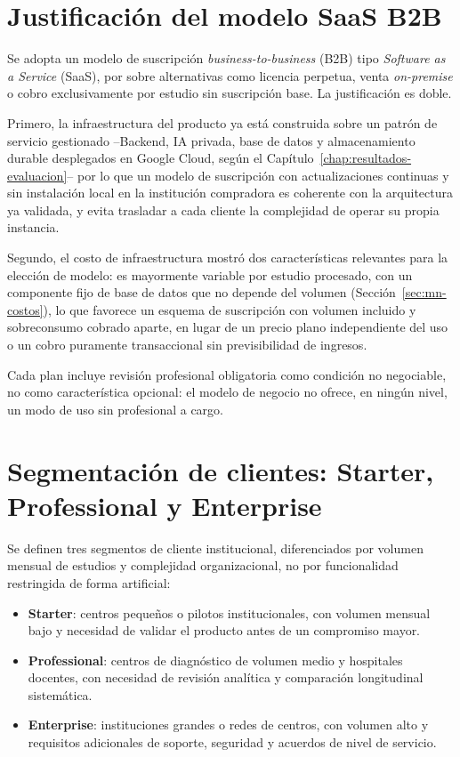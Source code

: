 \section{Justificación del modelo SaaS B2B}
\label{sec:mn-justificacion-saas}

Se adopta un modelo de suscripción \textit{business-to-business} (B2B) tipo \textit{Software as a Service} (SaaS), por sobre alternativas como licencia perpetua, venta \textit{on-premise} o cobro exclusivamente por estudio sin suscripción base. La justificación es doble.

Primero, la infraestructura del producto ya está construida sobre un patrón de servicio gestionado --Backend, IA privada, base de datos y almacenamiento durable desplegados en Google Cloud, según el Capítulo~\ref{chap:resultados-evaluacion}-- por lo que un modelo de suscripción con actualizaciones continuas y sin instalación local en la institución compradora es coherente con la arquitectura ya validada, y evita trasladar a cada cliente la complejidad de operar su propia instancia.

Segundo, el costo de infraestructura mostró dos características relevantes para la elección de modelo: es mayormente variable por estudio procesado, con un componente fijo de base de datos que no depende del volumen (Sección~\ref{sec:mn-costos}), lo que favorece un esquema de suscripción con volumen incluido y sobreconsumo cobrado aparte, en lugar de un precio plano independiente del uso o un cobro puramente transaccional sin previsibilidad de ingresos.

Cada plan incluye revisión profesional obligatoria como condición no negociable, no como característica opcional: el modelo de negocio no ofrece, en ningún nivel, un modo de uso sin profesional a cargo.

\section{Segmentación de clientes: Starter, Professional y Enterprise}
\label{sec:mn-segmentacion}

Se definen tres segmentos de cliente institucional, diferenciados por volumen mensual de estudios y complejidad organizacional, no por funcionalidad restringida de forma artificial:

\begin{itemize}
    \item \textbf{Starter}: centros pequeños o pilotos institucionales, con volumen mensual bajo y necesidad de validar el producto antes de un compromiso mayor.
    \item \textbf{Professional}: centros de diagnóstico de volumen medio y hospitales docentes, con necesidad de revisión analítica y comparación longitudinal sistemática.
    \item \textbf{Enterprise}: instituciones grandes o redes de centros, con volumen alto y requisitos adicionales de soporte, seguridad y acuerdos de nivel de servicio.
\end{itemize}

